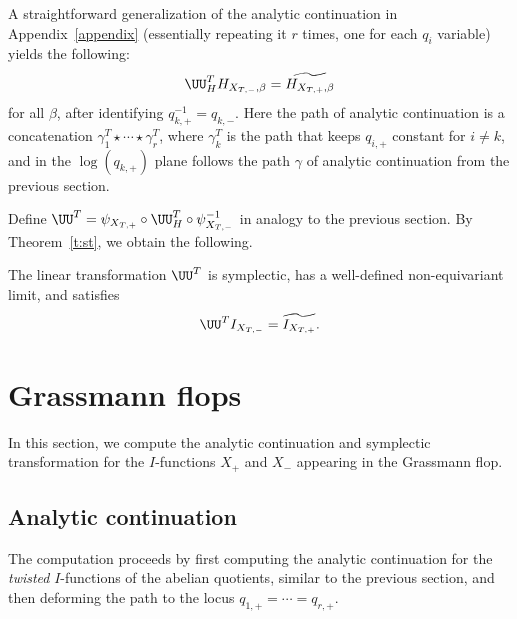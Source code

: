 A straightforward generalization of the analytic continuation in Appendix~\ref{appendix} (essentially repeating it $r$ times, one for each $q_i$ variable) yields the following:
\[
\UU_H^T H_{X_{T,-}, \beta} = \widetilde{H_{X_{T,+}, \beta}}
\]
for all $\beta$, after identifying $q_{k, +}^{-1} = q_{k, -}$. Here the path of analytic continuation is a concatenation
$\gamma_1^T \star \cdots \star \gamma_r^T$,
where $\gamma_k^T$ is the path that keeps $q_{i, +}$ constant for $i \neq k$, and in the $ \log(q_{k, +})$ plane follows the path $\gamma$ of analytic continuation from the previous section.

Define
$\UU^T = \psi_{X_{T,+}} \circ \UU_H^T \circ \psi_{X_{T,-}}^{-1}$
in analogy to the previous section. By Theorem~\ref{t:st}, we obtain the following.
\begin{Theorem} %
The linear transformation $\UU^T$ is symplectic, has a well-defined non-equivariant limit, and satisfies
\[
\UU^T I_{X_{T,-}} =\widetilde{I_{X_{T,+}}}.
\]
\end{Theorem}


\section{Grassmann flops}
In this section, we compute the analytic continuation and symplectic transformation for the $I$-functions $X_+$ and $X_-$ appearing in the Grassmann flop.

\subsection{Analytic continuation}
The computation proceeds by first computing the analytic continuation for the \emph{twisted} $I$-functions of the abelian quotients, similar to the previous section, and then deforming the path to the locus $q_{1, +} = \cdots = q_{r, +}$.

